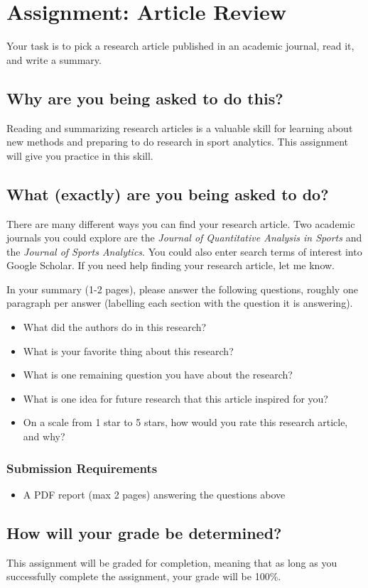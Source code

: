 \documentclass{article}
\begin{document}
  \section*{\sc Assignment: Article Review}

    Your task is to pick a research article published in an academic journal, read it, and write a summary.
  
    \subsection*{\sc Why are you being asked to do this?}

      Reading and summarizing research articles is a valuable skill for learning about new methods and preparing to do research in sport analytics. This assignment will give you practice in this skill.

    \subsection*{\sc What (exactly) are you being asked to do?}

      There are many different ways you can find your research article. Two academic journals you could explore are the {\it Journal of Quantitative Analysis in Sports} and the {\it Journal of Sports Analytics}. You could also enter search terms of interest into Google Scholar. If you need help finding your research article, let me know.

      In your summary (1-2 pages), please answer the following questions, roughly one paragraph per answer (labelling each section with the question it is answering).
      \begin{itemize}
        \item What did the authors do in this research?
        \item What is your favorite thing about this research?
        \item What is one remaining question you have about the research?
        \item What is one idea for future research that this article inspired for you?
        \item On a scale from 1 star to 5 stars, how would you rate this research article, and why?
      \end{itemize}

      \subsubsection*{\sc Submission Requirements}

        \begin{itemize}
          \item A PDF report (max 2 pages) answering the questions above
        \end{itemize}

    \subsection*{\sc How will your grade be determined?}
    
      This assignment will be graded for completion, meaning that as long as you successfully complete the assignment, your grade will be 100\%.
\end{document}
